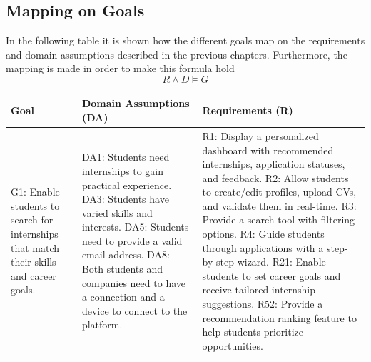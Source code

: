 \subsection{Mapping on Goals}
In the following table it is shown how the different goals map on the requirements and domain assumptions described in the previous chapters. Furthermore, the mapping is made in order to make this formula hold 
\begin{equation}
R \land D \models G
\end{equation}
\begin{longtable}{| p{} | p{} | p{} |}
\hline
\textbf{Goal} & \textbf{Domain Assumptions (DA)} & \textbf{Requirements (R)} \\ 
\hline
G1: Enable students to search for internships that match their skills and career goals. & DA1: Students need internships to gain practical experience. \newline DA3: Students have varied skills and interests. \newline DA5: Students need to provide a valid email address. \newline DA8: Both students and companies need to have a connection and a device to connect to the platform. & R1: Display a personalized dashboard with recommended internships, application statuses, and feedback. \newline R2: Allow students to create/edit profiles, upload CVs, and validate them in real-time. \newline R3: Provide a search tool with filtering options. \newline R4: Guide students through applications with a step-by-step wizard. \newline R21: Enable students to set career goals and receive tailored internship suggestions. \newline R52: Provide a recommendation ranking feature to help students prioritize opportunities. \\ \hline


\end{longtable}
